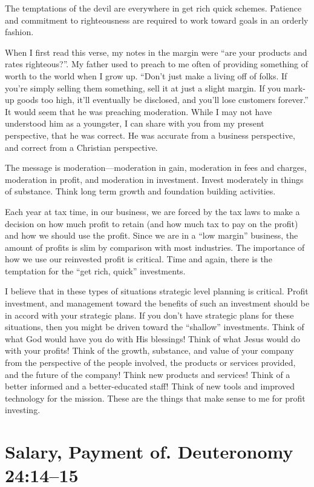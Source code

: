 \documentclass[12pt]{memoir}
\begin{document}
The temptations of the devil are everywhere in get rich quick schemes. Patience and commitment to righteousness are required to
work toward goals in an orderly fashion. 

When I first read this verse, my notes in the margin were ``are your
products and rates righteous?''. My father used to preach to me often
of providing something of worth to the world when I grow up. ``Don't
just make a living off of folks. If you're simply selling them something,
sell it at just a slight margin. If you mark-up goods too high, it'll
eventually be disclosed, and you'll lose customers forever.'' It
would seem that he was preaching moderation. While I may not have
understood him as a youngster, I can share with you from my present
perspective, that he was correct. He was accurate from a business
perspective, and correct from a Christian perspective. 

The message is moderation---moderation in gain, moderation in fees
and charges, moderation in profit, and moderation in investment. Invest
moderately in things of substance. Think long term growth and foundation
building activities.

Each year at tax time, in our business, we are forced by the tax laws
to make a decision on how much profit to retain (and how much tax
to pay on the profit) and how we should use the profit. Since we are
in a ``low margin'' business, the amount of profits is slim by comparison
with most industries. The importance of how we use our reinvested
profit is critical. Time and again, there is the temptation for the
``get rich, quick'' investments. 

I believe that in these types of situations strategic level planning
is critical. Profit investment, and management toward the benefits
of such an investment should be in accord with your strategic plans.
If you don't have strategic plans for these situations, then you might
be driven toward the ``shallow'' investments. Think of what God
would have you do with His blessings! Think of what Jesus would do
with your profits! Think of the growth, substance, and value of your
company from the perspective of the people involved, the products
or services provided, and the future of the company! Think new products
and services! Think of a better informed and a better-educated staff!
Think of new tools and improved technology for the mission. These
are the things that make sense to me for profit investing.

\section{Salary, Payment of. Deuteronomy 24:14--15}
\end{document}
